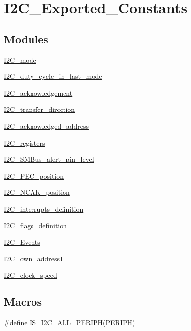 \hypertarget{group___i2_c___exported___constants}{}\section{I2\+C\+\_\+\+Exported\+\_\+\+Constants}
\label{group___i2_c___exported___constants}
\subsection*{Modules}
\begin{DoxyCompactItemize}
\item 
\mbox{\hyperlink{group___i2_c__mode}{I2\+C\+\_\+mode}}
\item 
\mbox{\hyperlink{group___i2_c__duty__cycle__in__fast__mode}{I2\+C\+\_\+duty\+\_\+cycle\+\_\+in\+\_\+fast\+\_\+mode}}
\item 
\mbox{\hyperlink{group___i2_c__acknowledgement}{I2\+C\+\_\+acknowledgement}}
\item 
\mbox{\hyperlink{group___i2_c__transfer__direction}{I2\+C\+\_\+transfer\+\_\+direction}}
\item 
\mbox{\hyperlink{group___i2_c__acknowledged__address}{I2\+C\+\_\+acknowledged\+\_\+address}}
\item 
\mbox{\hyperlink{group___i2_c__registers}{I2\+C\+\_\+registers}}
\item 
\mbox{\hyperlink{group___i2_c___s_m_bus__alert__pin__level}{I2\+C\+\_\+\+S\+M\+Bus\+\_\+alert\+\_\+pin\+\_\+level}}
\item 
\mbox{\hyperlink{group___i2_c___p_e_c__position}{I2\+C\+\_\+\+P\+E\+C\+\_\+position}}
\item 
\mbox{\hyperlink{group___i2_c___n_c_a_k__position}{I2\+C\+\_\+\+N\+C\+A\+K\+\_\+position}}
\item 
\mbox{\hyperlink{group___i2_c__interrupts__definition}{I2\+C\+\_\+interrupts\+\_\+definition}}
\item 
\mbox{\hyperlink{group___i2_c__flags__definition}{I2\+C\+\_\+flags\+\_\+definition}}
\item 
\mbox{\hyperlink{group___i2_c___events}{I2\+C\+\_\+\+Events}}
\item 
\mbox{\hyperlink{group___i2_c__own__address1}{I2\+C\+\_\+own\+\_\+address1}}
\item 
\mbox{\hyperlink{group___i2_c__clock__speed}{I2\+C\+\_\+clock\+\_\+speed}}
\end{DoxyCompactItemize}
\subsection*{Macros}
\begin{DoxyCompactItemize}
\item 
\#define \mbox{\hyperlink{group___i2_c___exported___constants_ga2e57489a40603d6ab7ff115b94eeb303}{I\+S\+\_\+\+I2\+C\+\_\+\+A\+L\+L\+\_\+\+P\+E\+R\+I\+PH}}(P\+E\+R\+I\+PH)
\end{DoxyCompactItemize}


